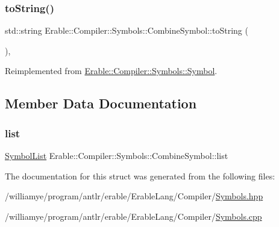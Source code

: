 \subsubsection{\texorpdfstring{toString()}{toString()}}
{\footnotesize\ttfamily std\+::string Erable\+::\+Compiler\+::\+Symbols\+::\+Combine\+Symbol\+::to\+String (\begin{DoxyParamCaption}{ }\end{DoxyParamCaption})\hspace{0.3cm}{\ttfamily [override]}, {\ttfamily [virtual]}}



Reimplemented from \mbox{\hyperlink{class_erable_1_1_compiler_1_1_symbols_1_1_symbol_ac133ad05913f81e836ae2f73815d1432}{Erable\+::\+Compiler\+::\+Symbols\+::\+Symbol}}.



\subsection{Member Data Documentation}
\mbox{\label{struct_erable_1_1_compiler_1_1_symbols_1_1_combine_symbol_a5bacd166436d523d163b11fb0d343b2e}} 
\subsubsection{\texorpdfstring{list}{list}}
{\footnotesize\ttfamily \mbox{\hyperlink{namespace_erable_1_1_compiler_1_1_symbols_a63e8157d2f729d4689d27bacad42f8ed}{Symbol\+List}} Erable\+::\+Compiler\+::\+Symbols\+::\+Combine\+Symbol\+::list}



The documentation for this struct was generated from the following files\+:\begin{DoxyCompactItemize}
\item 
/williamye/program/antlr/erable/\+Erable\+Lang/\+Compiler/\mbox{\hyperlink{_symbols_8hpp}{Symbols.\+hpp}}\item 
/williamye/program/antlr/erable/\+Erable\+Lang/\+Compiler/\mbox{\hyperlink{_symbols_8cpp}{Symbols.\+cpp}}\end{DoxyCompactItemize}
